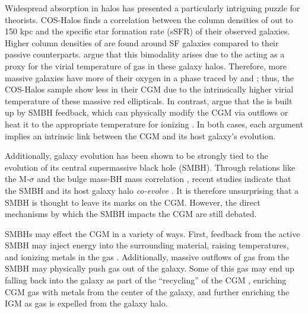 \documentclass[]{emulateapj}
\begin{document}
Widespread  absorption in halos has presented a particularly intriguing puzzle for theorists. COS-Halos finds a correlation between the column densities of  out to 150 kpc and the specific star formation rate (sSFR) of their observed galaxies. Higher column densities of  are found around SF galaxies compared to their passive counterparts. \cite{Oppenheimer2016} argue that this bimodality arises due to the  acting as a proxy for the virial temperature of gas in these galaxy halos. Therefore, more massive galaxies have more of their oxygen in a phase traced by  and ; thus, the COS-Halos sample show less  in their CGM due to the intrinsically higher virial temperature of these massive red ellipticals. In contrast, \cite{Suresh2017} argue that the  is built up by SMBH feedback, which can physically modify the CGM via outflows or heat it to the appropriate temperature for ionizing . In both cases, each argument implies an intrinsic link between the CGM and its host galaxy's evolution. 

Additionally, galaxy evolution has been shown to be strongly tied to the evolution of its central supermassive black hole (SMBH). Through relations like the M-$\sigma$ and the bulge mass-BH mass correlation \citep{Ferrarese2000,Mcconnell2013}, recent studies indicate that the SMBH and its host galaxy halo \textit{co-evolve} \citep[][and references therein]{Gebhardt2000,Volonteri2012b,Kormendy2013,Reines2015c}.   It is therefore unsurprising that a SMBH is thought to leave its marks on the CGM. However, the direct mechanisms by which the SMBH impacts the CGM are still debated. 

SMBHs may effect the CGM in a variety of ways. First, feedback from the active SMBH may inject energy into the surrounding material, raising temperatures, and ionizing metals in the gas \citep{McQuinn2017,Mathews2017,Oppenheimer2018}. Additionally, massive outflows of gas from the SMBH may physically push gas out of the galaxy. Some of this gas may end up falling back into the galaxy as part of the ``recycling'' of the CGM \citep{Tumlinson2017}, enriching CGM gas with metals from the center of the galaxy, and further enriching the IGM as gas is expelled from the galaxy halo.  
\end{document}
